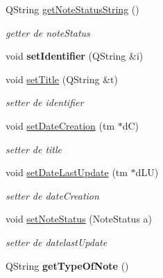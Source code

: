 \begin{DoxyCompactItemize}
Q\+String \hyperlink{classNote_aaabdeec91ac3ba33d4513f11da478f6d}{get\+Note\+Status\+String} ()
\begin{DoxyCompactList}\small\item\em getter de note\+Status \end{DoxyCompactList}\item 
\mbox{\label{classNote_aab6015157af6b820ca4f8e0ac9496d8e}} 
void {\bfseries set\+Identifier} (Q\+String \&i)
\item 
\mbox{\label{classNote_abdc1edf43c8a726494fea803c7c0308d}} 
void \hyperlink{classNote_abdc1edf43c8a726494fea803c7c0308d}{set\+Title} (Q\+String \&t)
\begin{DoxyCompactList}\small\item\em setter de identifier \end{DoxyCompactList}\item 
\mbox{\label{classNote_a5f41e99b5c555746bb87700ac4c0411b}} 
void \hyperlink{classNote_a5f41e99b5c555746bb87700ac4c0411b}{set\+Date\+Creation} (tm $\ast$dC)
\begin{DoxyCompactList}\small\item\em setter de title \end{DoxyCompactList}\item 
\mbox{\label{classNote_a8ed9a6b738003ef4c138b23a927dd6d1}} 
void \hyperlink{classNote_a8ed9a6b738003ef4c138b23a927dd6d1}{set\+Date\+Last\+Update} (tm $\ast$d\+LU)
\begin{DoxyCompactList}\small\item\em setter de date\+Creation \end{DoxyCompactList}\item 
\mbox{\label{classNote_aa72d89b6c782cfc5e90f360757307746}} 
void \hyperlink{classNote_aa72d89b6c782cfc5e90f360757307746}{set\+Note\+Status} (Note\+Status a)
\begin{DoxyCompactList}\small\item\em setter de datelast\+Update \end{DoxyCompactList}\item 
\mbox{\label{classNote_ad82cb1f2fe6f5c8fab8ca4cf1f0759b4}} 
Q\+String {\bfseries get\+Type\+Of\+Note} ()
\item 

\end{DoxyCompactItemize}
